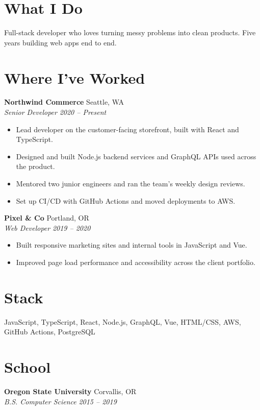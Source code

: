 \documentclass[11pt,letterpaper]{article}
\newcommand{\entry}[4]{\textbf{#1} \hfill #2\\ \textit{#3} \hfill \textit{#4}\par}
\begin{document}
\section{What I Do}
Full-stack developer who loves turning messy problems into clean products.
Five years building web apps end to end.

\section{Where I've Worked}
\entry{Northwind Commerce}{Seattle, WA}{Senior Developer}{2020 -- Present}
\begin{itemize}
  \item Lead developer on the customer-facing storefront, built with React and TypeScript.
  \item Designed and built Node.js backend services and GraphQL APIs used across the product.
  \item Mentored two junior engineers and ran the team's weekly design reviews.
  \item Set up CI/CD with GitHub Actions and moved deployments to AWS.
\end{itemize}

\entry{Pixel \& Co}{Portland, OR}{Web Developer}{2019 -- 2020}
\begin{itemize}
  \item Built responsive marketing sites and internal tools in JavaScript and Vue.
  \item Improved page load performance and accessibility across the client portfolio.
\end{itemize}

\section{Stack}
JavaScript, TypeScript, React, Node.js, GraphQL, Vue, HTML/CSS, AWS, GitHub Actions, PostgreSQL

\section{School}
\entry{Oregon State University}{Corvallis, OR}{B.S. Computer Science}{2015 -- 2019}
\end{document}
